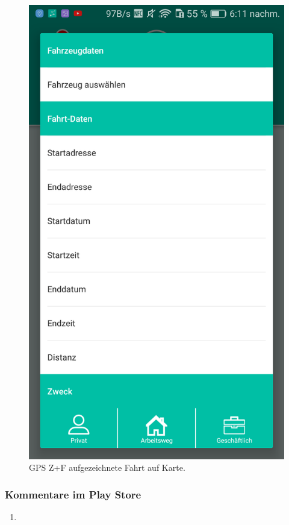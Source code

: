\documentclass[a4paper]{article}
\begin{document}
\begin{figure}[H]
\begin{minipage}[b]{.4\linewidth}
        \includegraphics[scale=0.14]{img/squ4}
        \caption{\label{img:img/squ4}GPS Z+F aufgezeichnete Fahrt auf Karte.}
    \end{minipage}
\end{figure}

\subsubsection{Kommentare im Play Store}
\begin{enumerate}
    \item
\end{enumerate}
\end{document}
